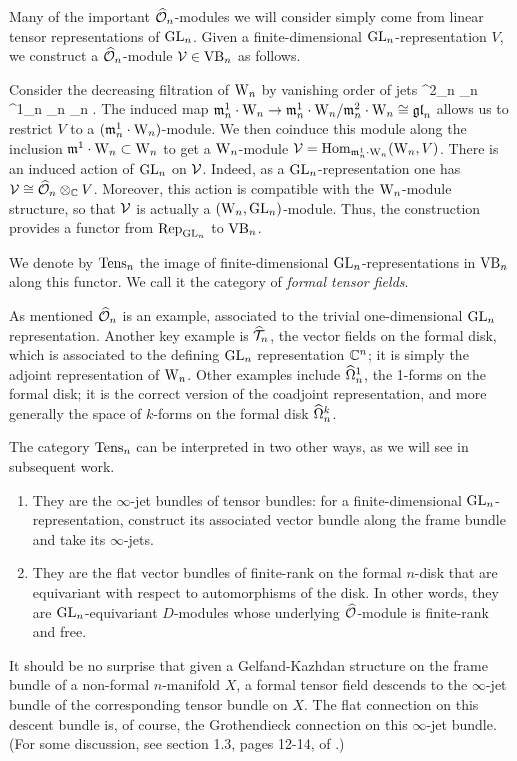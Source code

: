 Many of the important $\widehat{\mathcal O}_n$-modules we will consider simply come from linear tensor representations of ${\rm GL}_n$. 
Given a finite-dimensional ${\rm GL}_n$-representation $V$, we construct a $\widehat{\mathcal O}_n$-module $\mathcal{V} \in {\rm VB}_n$ as follows. 

Consider the decreasing filtration of ${{\rm W}_n}$ by vanishing order of jets 
\ben
\cdots \subset \fm^{2}_n _{n} \subset \fm^1_n _n _n .
\een 
The induced map ${\mathfrak m}_n^1 \cdot {{\rm W}_n} \to {\mathfrak m}_n^1 \cdot {{\rm W}_n} / {\mathfrak m}_n^2
\cdot {{\rm W}_n} \cong {\mathfrak{gl}}_n$ allows us to restrict $V$ to a $({\mathfrak m}_n^1 \cdot
{{\rm W}_n})$-module. 
We  then coinduce this module along the inclusion ${\mathfrak m}^1 \cdot {{\rm W}_n}
\subset {{\rm W}_n}$ to get a ${{\rm W}_n}$-module $\mathcal{V} = {\rm Hom}_{{\mathfrak m}_n^1 \cdot {{\rm W}_n}}({{\rm W}_n},V)$. 
There is an induced action of ${\rm GL}_n$ on $\mathcal{V}$. Indeed, as a ${\rm GL}_n$-representation one has $\mathcal{V} \cong \widehat{\mathcal O}_n \otimes_{\mathbb C} V$.
Moreover, this action is compatible with the ${{\rm W}_n}$-module structure, so that $\mathcal{V}$ is actually a $({{\rm W}_n}, {\rm GL}_n)$-module. 
Thus, the construction provides a functor  from ${\rm Rep}_{{\rm GL}_n}$ to
${\rm VB}_n$.

\begin{dfn} 
We denote by ${\rm Tens}_n$ the image of finite-dimensional ${\rm GL}_n$-representations in ${\rm VB}_n$ along this functor. 
We call it the category of {\em formal tensor fields}.
\end{dfn}

As mentioned $\widehat{\mathcal O}_n$ is an example, associated to the trivial one-dimensional ${\rm GL}_n$ representation.
Another key example is $\widehat{\mathcal T}_n$, the vector fields on the formal disk, which is associated to the defining ${\rm GL}_n$ representation $\mathbb C^n$; 
it is simply the adjoint representation of ${{\rm W}_n}$.
Other examples include $\widehat{\Omega}^1_n$, the 1-forms on the formal disk; it
is the correct version of the coadjoint representation, and more
generally the space of $k$-forms on the formal disk $\widehat{\Omega}^k_n$. 

The category ${\rm Tens}_n$ can be interpreted in two other ways, as we will see in subsequent work.
\begin{enumerate}
\item They are the $\infty$-jet bundles of tensor bundles: for a finite-dimensional ${\rm GL}_n$-representation, 
construct its associated vector bundle along the frame bundle and take its $\infty$-jets.
\item They are the flat vector bundles of finite-rank on the formal $n$-disk that are equivariant with respect to automorphisms of the disk. 
In other words, they are ${\rm GL}_n$-equivariant $D$-modules whose underlying $\widehat{\mathcal O}$-module is finite-rank and free.
\end{enumerate}
It should be no surprise that given a Gelfand-Kazhdan structure on the frame bundle of a non-formal $n$-manifold $X$, 
a formal tensor field descends to the $\infty$-jet bundle of the corresponding tensor bundle on $X$. 
The flat connection on this descent bundle is, of course, the Grothendieck connection on this $\infty$-jet bundle. 
(For some discussion, see section 1.3, pages 12-14, of \cite{Fuks}.)

